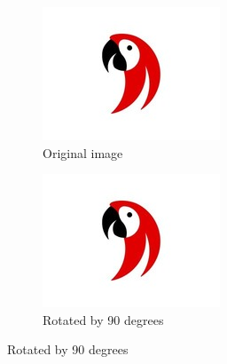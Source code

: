 \documentclass{article}
\begin{document}
	\begin{figure}
		\centering
		\begin{subfigure}{0.3\textwidth} %
			\centering
			\includegraphics[width=\textwidth]{parrot.jpeg}
			\caption{Original image}
		\end{subfigure}

	
	\begin{subfigure}{0.3\textwidth}
		\centering
		\includegraphics[width=\textwidth, angle=90]{parrot.jpeg}
		\caption{Rotated by 90 degrees}
	\end{subfigure}


\end{figure}
\end{document}
